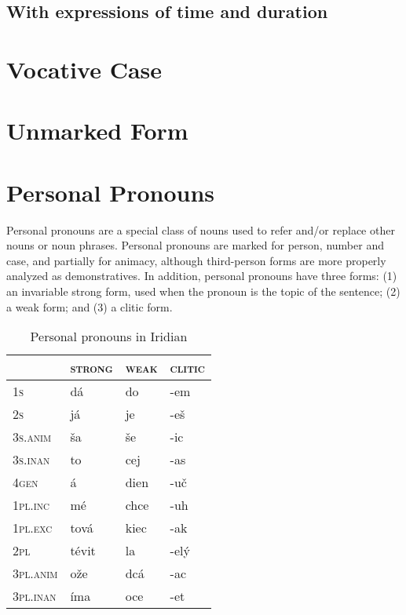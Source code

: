 \subsection{With expressions of time and duration}

\section{Vocative Case}


\section{Unmarked Form}


\section{Personal Pronouns}

Personal pronouns are a special class of nouns used to refer and/or replace other nouns or noun phrases. Personal pronouns are marked for person, number and case, and partially for animacy, although third-person forms are more properly analyzed as demonstratives. In addition, personal pronouns have three forms: (1) an invariable strong form, used when the pronoun is the topic of the sentence; (2) a weak form; and (3) a clitic form.

\begin{table}[h!]
	\caption{Personal pronouns in Iridian}
	\centering\small
	\begin{tabularx}{0.8\textwidth}{>{\scshape}YMMM}

		\toprule
		 &\textsc{strong} &\textsc{weak}&\textsc{clitic}\\
		\midrule
		1s &dá&do&-em\\ \addlinespace
		2s&já&je&-e\v{s}\\ \addlinespace
		3s.anim&\v{s}a&\v{s}e&-ic\\ \addlinespace
		3s.inan&to&cej&-as\\ \addlinespace
		4gen&á&dien&-u\v{c}\\ \addlinespace
		1pl.inc&m\'e&chce&-uh\\ \addlinespace
		1pl.exc&tov\'a&kiec&-ak\\ \addlinespace
		2pl&t\'evit&la&-elý\\ \addlinespace
		3pl.anim&o\v{z}e&dcá&-ac\\ \addlinespace
		3pl.inan&\'ima&oce&-et\\ \bottomrule
	\end{tabularx}
\end{table}

